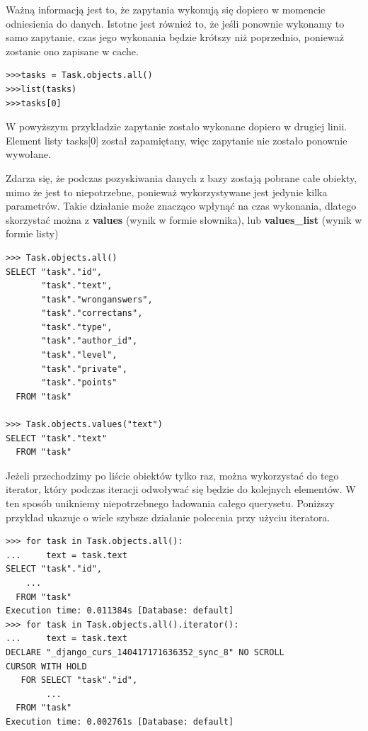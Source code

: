 \documentclass[oneside,polski,logo,indent]{amuthesis}
\begin{document}
\begin{enumerate}
\begin{enumerate}
Ważną informacją jest to, że zapytania wykonują się dopiero w momencie odniesienia do danych. Istotne jest również to, że jeśli ponownie wykonamy to samo zapytanie, czas jego wykonania będzie krótszy niż poprzednio, ponieważ zostanie ono zapisane w cache.
\begin{lstlisting}[style=DOS]
>>>tasks = Task.objects.all()
>>>list(tasks)
>>>tasks[0]
\end{lstlisting}
W powyższym przykładzie zapytanie zostało wykonane dopiero w drugiej linii. Element listy tasks[0] został zapamiętany, więc zapytanie nie zostało ponownie wywołane.

Zdarza się, że podczas pozyskiwania danych z bazy zostają pobrane całe obiekty, mimo że jest to niepotrzebne, ponieważ wykorzystywane jest jedynie kilka parametrów. Takie działanie może znacząco wpłynąć na czas wykonania, dlatego skorzystać można z \textbf{values} (wynik w formie słownika), lub \textbf{values\_list} (wynik w formie listy)
\begin{lstlisting}[style=DOS]
>>> Task.objects.all()
SELECT "task"."id",
       "task"."text",
       "task"."wronganswers",
       "task"."correctans",
       "task"."type",
       "task"."author_id",
       "task"."level",
       "task"."private",
       "task"."points"
  FROM "task"

>>> Task.objects.values("text")
SELECT "task"."text"
  FROM "task"
\end{lstlisting}
Jeżeli przechodzimy po liście obiektów tylko raz, można wykorzystać do tego iterator, który podczas iteracji odwoływać się będzie do kolejnych elementów. W ten sposób unikniemy niepotrzebnego ładowania całego querysetu. Poniższy przykład ukazuje o wiele szybsze działanie polecenia przy użyciu iteratora.
\begin{lstlisting}[style=DOS]
>>> for task in Task.objects.all():
...     text = task.text
SELECT "task"."id",
	...
  FROM "task"
Execution time: 0.011384s [Database: default]
>>> for task in Task.objects.all().iterator():
...     text = task.text
DECLARE "_django_curs_140417171636352_sync_8" NO SCROLL
CURSOR WITH HOLD
   FOR SELECT "task"."id",
		...
  FROM "task"
Execution time: 0.002761s [Database: default]
\end{lstlisting}


\end{enumerate}
\end{enumerate}
\end{document}
